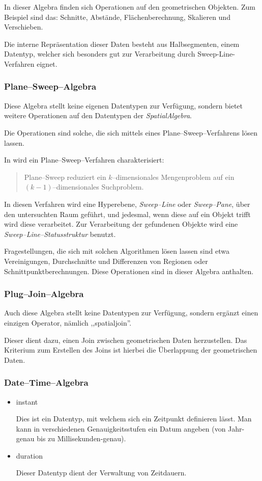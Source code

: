 In dieser Algebra finden sich Operationen auf den geometrischen Objekten. Zum Beispiel sind das:
 Schnitte, Abstände, Flächenberechnung, Skalieren und Verschieben.
 
Die interne Repräsentation dieser Daten besteht aus Halbsegmenten, einem Datentyp, welcher sich besonders gut zur Verarbeitung durch Sweep-Line-Verfahren eignet.

\subsubsection{Plane--Sweep--Algebra}

Diese Algebra stellt keine eigenen Datentypen zur Verfügung, sondern bietet weitere Operationen auf den Datentypen der \textit{SpatialAlgebra}.

Die Operationen sind solche, die sich mittels eines Plane--Sweep--Verfahrens lösen lassen.

In \cite{Guet} wird ein Plane--Sweep--Verfahren charakterisiert:
\begin{quotation}
Plane--Sweep reduziert ein $k$--dimensionales Mengenproblem auf ein $(k-1)$--dimensionales Suchproblem.
\end{quotation} 
In diesen Verfahren wird eine Hyperebene, \textit{Sweep--Line} oder \textit{Sweep--Pane}, über den untersuchten Raum geführt, und jedesmal, wenn diese auf ein Objekt trifft wird diese verarbeitet.
Zur Verarbeitung der gefundenen Objekte wird eine \textit{Sweep--Line--Statusstruktur} benutzt.

Fragestellungen, die sich mit solchen Algorithmen lösen lassen sind etwa Vereinigungen, Durchschnitte und Differenzen von Regionen oder Schnittpunktberechnungen. Diese Operationen sind in dieser Algebra anthalten.

\subsubsection{Plug--Join--Algebra}

Auch diese Algebra stellt keine Datentypen zur Verfügung, sondern ergänzt einen einzigen Operator, nämlich ,,spatialjoin''.

Dieser dient dazu, einen Join zwischen geometrischen Daten herzustellen. Das Kriterium zum Erstellen des Joins ist hierbei die Überlappung der geometrischen Daten. 

\subsubsection{Date--Time--Algebra}
\begin{itemize}
\item instant

Dies ist ein Datentyp, mit welchem sich ein Zeitpunkt definieren lässt. Man kann in verschiedenen Genauigkeitsstufen ein Datum angeben (von Jahr-genau bis zu Millisekunden-genau).
\item duration

Dieser Datentyp dient der Verwaltung von Zeitdauern.
\end{itemize}

